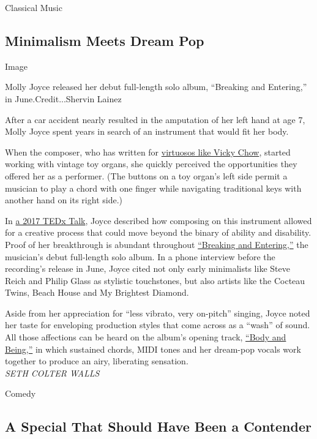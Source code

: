 Classical Music

\hypertarget{minimalism-meets-dream-pop}{%
\subsection{Minimalism Meets Dream
Pop}\label{minimalism-meets-dream-pop}}

Image

Molly Joyce released her debut full-length solo album, ``Breaking and
Entering,'' in June.Credit...Shervin Lainez

After a car accident nearly resulted in the amputation of her left hand
at age 7, Molly Joyce spent years in search of an instrument that would
fit her body.

When the composer, who has written for
\href{https://vickychow.bandcamp.com/track/rave-composed-by-molly-joyce}{virtuosos
like Vicky Chow}, started working with vintage toy organs, she quickly
perceived the opportunities they offered her as a performer. (The
buttons on a toy organ's left side permit a musician to play a chord
with one finger while navigating traditional keys with another hand on
its right side.)

In \href{https://www.youtube.com/watch?v=HcIavUYjRzg}{a 2017 TEDx Talk},
Joyce described how composing on this instrument allowed for a creative
process that could move beyond the binary of ability and disability.
Proof of her breakthrough is abundant throughout
\href{https://mollyjoyce.bandcamp.com/album/breaking-and-entering}{``Breaking
and Entering,''} the musician's debut full-length solo album. In a phone
interview before the recording's release in June, Joyce cited not only
early minimalists like Steve Reich and Philip Glass as stylistic
touchstones, but also artists like the Cocteau Twins, Beach House and My
Brightest Diamond.

Aside from her appreciation for ``less vibrato, very on-pitch'' singing,
Joyce noted her taste for enveloping production styles that come across
as a ``wash'' of sound. All those affections can be heard on the album's
opening track,
\href{https://mollyjoyce.bandcamp.com/track/body-and-being}{``Body and
Being,''} in which sustained chords, MIDI tones and her dream-pop vocals
work together to produce an airy, liberating sensation.\\
\emph{SETH COLTER WALLS}

Comedy

\hypertarget{a-special-that-should-have-been-a-contender}{%
\subsection{A Special That Should Have Been a
Contender}\label{a-special-that-should-have-been-a-contender}}

